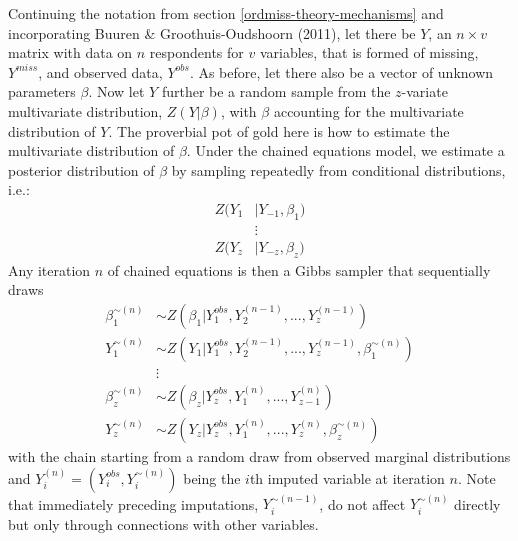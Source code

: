 \documentclass[12pt,econ]{sources/authesis}
\begin{document}
Continuing the notation from section \ref{ordmiss-theory-mechanisms} and incorporating Buuren \& Groothuis-Oudshoorn (2011), let there be \(Y\), an \(n \times v\) matrix with data on \(n\) respondents for \(v\) variables, that is formed of missing, \(Y^{miss}\), and observed data, \(Y^{obs}\). As before, let there also be a vector of unknown parameters \(\beta\). Now let \(Y\) further be a random sample from the \(z\)-variate multivariate distribution, \(Z(Y | \beta)\), with \(\beta\) accounting for the multivariate distribution of \(Y\). The proverbial pot of gold here is how to estimate the multivariate distribution of \(\beta\). Under the chained equations model, we estimate a posterior distribution of \(\beta\) by sampling repeatedly from conditional distributions, i.e.:
\begin{align}
Z(Y_1 &| Y_{-1}, \beta_1) \nonumber\\
&\vdots \nonumber\\
Z(Y_z &| Y_{-z}, \beta_z)
\end{align}
Any iteration \(n\) of chained equations is then a Gibbs sampler that sequentially draws
\begin{align}
\beta_1^{\sim(n)} &\sim Z(\beta_1 | Y_1^{obs}, Y_2^{(n-1)}, ..., Y_z^{(n-1)}) \nonumber\\
Y_1^{\sim(n)} &\sim Z(Y_1 | Y_1^{obs}, Y_2^{(n-1)}, ..., Y_z^{(n-1)}, \beta_1^{\sim(n)}) \nonumber\\
&\vdots \nonumber\\
\beta_z^{\sim(n)} &\sim Z(\beta_z | Y_z^{obs}, Y_1^{(n)}, ..., Y_{z-1}^{(n)}) \nonumber\\
Y_z^{\sim(n)} &\sim Z(Y_z | Y_z^{obs}, Y_1^{(n)}, ..., Y_z^{(n)}, \beta_z^{\sim(n)})
\end{align}
with the chain starting from a random draw from observed marginal distributions and \(Y_i^{(n)} = (Y_i^{obs}, Y_i^{\sim(n)})\) being the \(i\)th imputed variable at iteration \(n\). Note that immediately preceding imputations, \(Y_i^{\sim(n-1)}\), do not affect \(Y_i^{\sim(n)}\) directly but only through connections with other variables.
\end{document}
